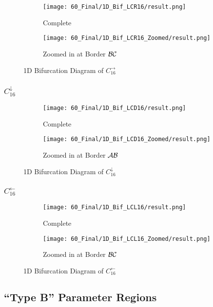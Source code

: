 \begin{figure}
    \centering
    \begin{subfigure}{0.4\textwidth}
        \centering
        \texttt{[image: 60\_Final/1D\_Bif\_LCR16/result.png]}
        \caption{Complete}
        \label{fig:bifurcation.C.right}
    \end{subfigure}
    \begin{subfigure}{0.4\textwidth}
        \centering
        \texttt{[image: 60\_Final/1D\_Bif\_LCR16\_Zoomed/result.png]}
        \caption{Zoomed in at Border $\mathcal{B}\mathcal{C}$}
        \label{fig:final.bifurcation.C.right.zoomed}
    \end{subfigure}
    \caption{1D Bifurcation Diagram of $C_{16}^\rightarrow$}
\end{figure}

\subsubsection{$C_{16}^\downarrow$}

\begin{figure}
    \centering
    \begin{subfigure}{0.4\textwidth}
        \centering
        \texttt{[image: 60\_Final/1D\_Bif\_LCD16/result.png]}
        \caption{Complete}
        \label{fig:bifurcation.C.down}
    \end{subfigure}
    \begin{subfigure}{0.4\textwidth}
        \centering
        \texttt{[image: 60\_Final/1D\_Bif\_LCD16\_Zoomed/result.png]}
        \caption{Zoomed in at Border $\mathcal{A}\mathcal{B}$}
        \label{fig:final.bifurcation.C.down.zoomed}
    \end{subfigure}
    \caption{1D Bifurcation Diagram of $C_{16}^\downarrow$}
\end{figure}

\subsubsection{$C_{16}^\leftarrow$}

\begin{figure}
    \centering
    \begin{subfigure}{0.4\textwidth}
        \centering
        \texttt{[image: 60\_Final/1D\_Bif\_LCL16/result.png]}
        \caption{Complete}
        \label{fig:bifurcation.C.left}
    \end{subfigure}
    \begin{subfigure}{0.4\textwidth}
        \centering
        \texttt{[image: 60\_Final/1D\_Bif\_LCL16\_Zoomed/result.png]}
        \caption{Zoomed in at Border $\mathcal{B}\mathcal{C}$}
        \label{fig:final.bifurcation.C.left.zoomed}
    \end{subfigure}
    \caption{1D Bifurcation Diagram of $C_{16}^\leftarrow$}
\end{figure}

\subsection{``Type B'' Parameter Regions}
